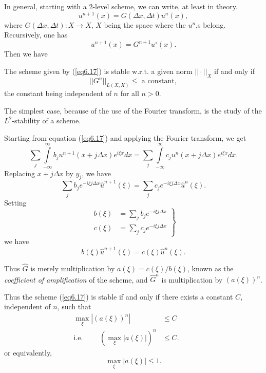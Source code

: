 In general, starting with a 2-level scheme, we can write, at least in
theory.
\begin{equation*}
u^{n+1} (x) = G(\Delta x, \Delta t) u^n (x), 
\tag{6.18}\label{eq6.18}
\end{equation*}
where $G(\Delta x, \Delta t): X \to X$, $X$ being the space where the
$u^n$,s belong. Recursively, one has 
\begin{equation*}
u^{n+1} (x) = G^{n+1} u^\circ(x). 
\tag{6.19}\label{eq6.19}
\end{equation*}
Then we have 

\begin{Definition}\label{chap6:def6.1}
The scheme given by (\ref{eq6.17}) is stable w.r.t. a given norm $||\cdot
||_X$ if and only if 
\begin{equation*}
|| G^n||_{L(X,X)} \leq \text{ a constant},
\tag{6.20}\label{eq6.20}
\end{equation*}
the constant being independent of $n$ for all $n>0$.
\end{Definition}

The simplest case, because of the use of the Fourier transform, is the
study of the $L^2$-stability of a scheme.

Starting from equation (\ref{eq6.17}) and applying the Fourier transform, we
get
$$
\sum\limits_j \int\limits^\infty_{-\infty} b_j u^{n+1} (x+j\Delta
x)e^{i\xi x} dx = \sum\limits_j \int\limits^\infty_{-\infty} c_j u^n
(x+ j\Delta x) e^{i\xi x} dx.
$$\pageoriginale 
Replacing $x + j \Delta x$  by $y_j$, we have
$$
\sum\limits_j b_j e^{-i \xi j \Delta x }  \hat{u}^{n+1} (\xi) =
\sum\limits_j c_j e^{-i\xi j \Delta x} \hat{u}^n(\xi).
$$
Setting
\begin{equation*}
\left.
\begin{aligned}
b (\xi) & = \sum\limits_j b_j e^{-i \xi j \Delta x}\\
c(\xi) & = \sum\limits_{j} c_j e^{-i \xi j \Delta x}
\end{aligned}
\right\}\tag{6.21}\label{eq6.21}
\end{equation*}
we have 
\begin{equation*}
b(\xi) \hat{u}^{n+1} (\xi) = c(\xi) \hat{u}^n (\xi). 
\tag{6.22}\label{eq6.22}
\end{equation*}

Thus $\hat{G}$ is merely multiplication by $a(\xi) = c(\xi) / b(\xi)$,
known as the {\em coefficient of amplification} of the scheme, and
$\hat{G}^n$ is multiplication by $(a(\xi))^n$.

Thus the scheme (\ref{eq6.17}) is stable if and only if there exists a
constant $C$, independent of $n$, such that
\begin{align*}
\max\limits_\xi |(a(\xi))^n| &  \leq C\\
\text{i.e. } \qquad (\max\limits_\xi |a (\xi)|)^n & \leq C. \qquad 
\end{align*}
or equivalently,
\begin{equation*}
\max\limits_{\xi} |a(\xi)| \leq 1.
\tag{6.23}\label{eq6.23}
\end{equation*}

